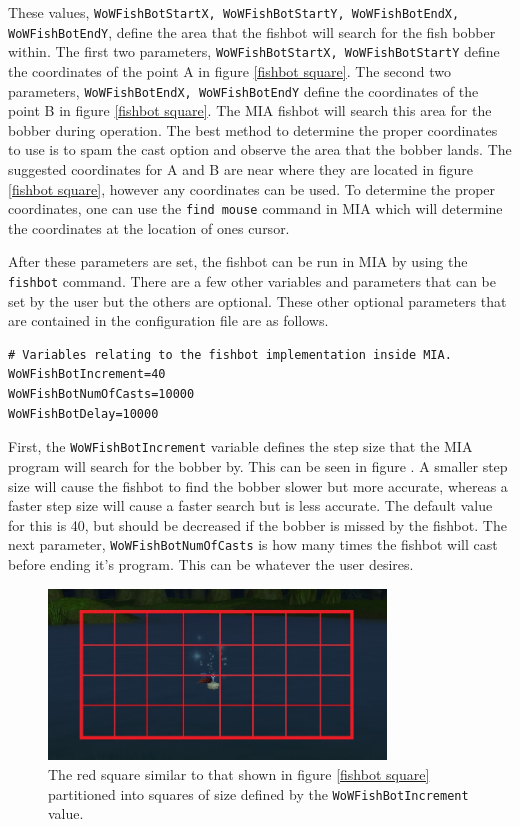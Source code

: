 These values, \texttt{WoWFishBotStartX, WoWFishBotStartY, WoWFishBotEndX, WoWFishBotEndY}, define the area that the fishbot will search for the fish bobber within. The first two parameters, \texttt{WoWFishBotStartX, WoWFishBotStartY} define the coordinates of the point A in figure \ref{fishbot square}. The second two parameters, \texttt{WoWFishBotEndX, WoWFishBotEndY} define the coordinates of the point B in figure \ref{fishbot square}. The MIA fishbot will search this area for the bobber during operation. The best method to determine the proper coordinates to use is to spam the cast option and observe the area that the bobber lands. The suggested coordinates for A and B are near where they are located in figure \ref{fishbot square}, however any coordinates can be used. To determine the proper coordinates, one can use the \texttt{find mouse} command in MIA which will determine the coordinates at the location of ones cursor.

After these parameters are set, the fishbot can be run in MIA by using the \texttt{fishbot} command. There are a few other variables and parameters that can be set by the user but the others are optional. These other optional parameters that are contained in the configuration file are as follows.

\begin{lstlisting}[style=pythonstyle]
# Variables relating to the fishbot implementation inside MIA.
WoWFishBotIncrement=40
WoWFishBotNumOfCasts=10000
WoWFishBotDelay=10000
\end{lstlisting}

First, the \texttt{WoWFishBotIncrement} variable defines the step size that the MIA program will search for the bobber by. This can be seen in figure \label{fishbot increments}. A smaller step size will cause the fishbot to find the bobber slower but more accurate, whereas a faster step size will cause a faster search but is less accurate. The default value for this is 40, but should be decreased if the bobber is missed by the fishbot. The next parameter, \texttt{WoWFishBotNumOfCasts} is how many times the fishbot will cast before ending it's program. This can be whatever the user desires. 



\begin{figure}[h]
	\centering
	\includegraphics[width=0.8\textwidth]{images/WoWScrnShot_040118_234227b.jpg}
	\caption{The red square similar to that shown in figure \ref{fishbot square} partitioned into squares of size defined by the \texttt{WoWFishBotIncrement} value.} \label{fishbot increments}
\end{figure}

